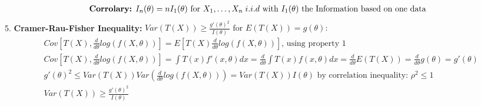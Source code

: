 \documentclass{article}
\begin{document}
\begin{align*}
    \textrm{\textbf{Corrolary:} } I_n(\theta) = nI_1(\theta) \textrm{ for } X_1, \dots, X_n \; i.i.d \textrm{ with } I_{1}(\theta) \textrm{ the Information based on one data}
\end{align*}
5. \textbf{Cramer-Rau-Fisher Inequality:} $Var(T(X)) \geq \frac{g'(\theta)^2}{I(\theta)} \textrm{ for } E(T(X)) = g(\theta):$
\begin{align*}
    & Cov[T(X), \frac{d}{d\theta}log(f(X, \theta))] = E[T(X)\frac{d}{d\theta}log(f(X, \theta))] \textrm{, using property 1}\\
    & Cov[T(X), \frac{d}{d\theta}log(f(X, \theta))] = \int T(x)f'(x, \theta)dx = \frac{d}{d\theta} \int T(x)  f(x, \theta)dx = \frac{d}{d\theta}E(T(X)) = \frac{d}{d\theta}g(\theta) = g'(\theta)\\
    &g'(\theta)^2 \leq Var(T(X))Var \left (\frac{d}{d\theta}log(f(X, \theta)) \right) = Var(T(X))I(\theta) \textrm{ by correlation inequality: } \rho^2 \leq 1\\
    &Var(T(X)) \geq \frac{g'(\theta)^2}{I(\theta)}
\end{align*}
\end{document}
